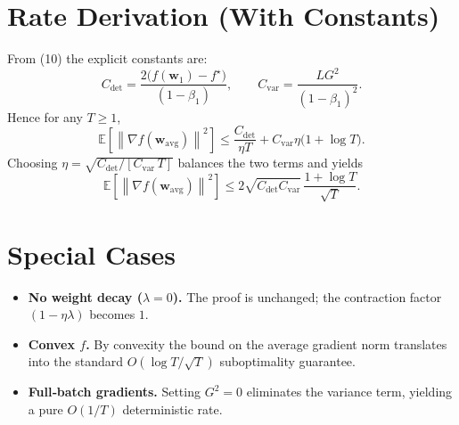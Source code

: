 \documentclass[11pt]{article}
\newcommand{\EE}{\mathbb{E}}
\newcommand{\norm}[1]{\left\lVert #1 \right\rVert}
\begin{document}
\section*{Rate Derivation (With Constants)}
From (10) the explicit constants are:
\[
C_{\text{det}} = \frac{2\bigl(f(\bm{w}_1)-f^\star\bigr)}{(1-\beta_1)},
\qquad
C_{\text{var}} = \frac{L G^{2}}{(1-\beta_1)^{2}}.
\]
Hence for any $T\ge 1$,
\[
\EE\!\left[\norm{\nabla f(\bm{w}_{\text{avg}})}^{2}\right]
\le \frac{C_{\text{det}}}{\eta T}
   + C_{\text{var}}\eta\bigl(1+\log T\bigr).
\]
Choosing $\eta = \sqrt{C_{\text{det}}/[C_{\text{var}}\,T]}$ balances the two terms and yields
\[
\EE\!\left[\norm{\nabla f(\bm{w}_{\text{avg}})}^{2}\right]
\le 2\sqrt{C_{\text{det}}C_{\text{var}}}\,\frac{1+\log T}{\sqrt{T}}.
\]

\section*{Special Cases}
\begin{itemize}
\item \textbf{No weight decay ($\lambda=0$).} The proof is unchanged; the contraction factor $(1-\eta\lambda)$ becomes $1$.
\item \textbf{Convex $f$.} By convexity the bound on the average gradient norm translates into the standard $O(\log T/\sqrt{T})$ suboptimality guarantee.
\item \textbf{Full‑batch gradients.} Setting $G^{2}=0$ eliminates the variance term, yielding a pure $O(1/T)$ deterministic rate.
\end{itemize}
\end{document}
